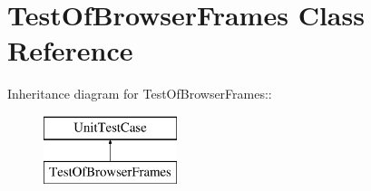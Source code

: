 \hypertarget{class_test_of_browser_frames}{
\section{TestOfBrowserFrames Class Reference}
\label{class_test_of_browser_frames}
}
Inheritance diagram for TestOfBrowserFrames::\begin{figure}[H]
\begin{center}
\leavevmode
\includegraphics[height=2cm]{class_test_of_browser_frames}
\end{center}
\end{figure}
